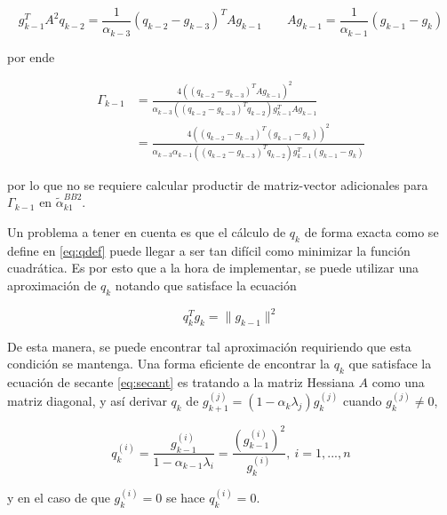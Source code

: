 \begin{equation*}
    g_{k-1}^TA^2q_{k-2} = \frac{1}{\alpha_{k-3}}(q_{k-2}-g_{k-3})^TAg_{k-1} \qquad Ag_{k-1}=\frac{1}{\alpha_{k-1}}(g_{k-1}-g_k)
\end{equation*}

por ende

\begin{align*}
    \Gamma_{k-1} & = \frac{4((q_{k-2}-g_{k-3})^TAg_{k-1})^2}{\alpha_{k-3}((q_{k-2}-g_{k-3})^Tq_{k-2})g_{k-1}^T Ag_{k-1}}                      \\
                 & = \frac{4((q_{k-2}-g_{k-3})^T(g_{k-1}-g_k))^2}{\alpha_{k-3}\alpha_{k-1}((q_{k-2}-g_{k-3})^Tq_{k-2})g_{k-1}^T(g_{k-1}-g_k)}
\end{align*}

por lo que no se requiere calcular productir de matriz-vector adicionales para $\Gamma_{k-1}$ en $\tilde{\alpha}_{k1}^{BB2}$.
\par Un problema a tener en cuenta es que el cálculo de $q_k$ de forma exacta como se define en \ref{eq:qdef} puede llegar a ser tan difícil como minimizar la función cuadrática. Es por esto que a la hora de implementar, se puede utilizar una aproximación de $q_k$ notando que satisface la ecuación

\begin{equation}
    q_k^Tg_k = \|g_{k-1}\|^2
    \label{eq:secant}
\end{equation}

De esta manera, se puede encontrar tal aproximación requiriendo que esta condición se mantenga. Una forma eficiente de encontrar la $q_k$ que satisface la ecuación de secante \ref{eq:secant} es tratando a la matriz Hessiana $A$ como una matriz diagonal, y así derivar $q_k$ de $g_{k+1}^{(j)} = (1-\alpha_k\lambda_j)g_k^{(j)}$ cuando $g_k^{(j)}\neq 0$,

\begin{equation}
    q_k^{(i)} = \frac{g_{k-1}^{(i)}}{1-\alpha_{k-1}\lambda_i} = \frac{(g_{k-1}^{(i)})^2}{g_k^{(i)}}, \ i=1, ..., n
\end{equation}

y en el caso de que $g_k^{(i)}=0$ se hace $q_k^{(i)}=0$.
